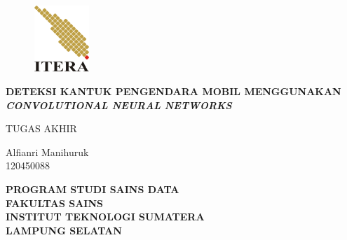 \clearpage
\pagestyle{empty}

\begin{center}
\smallskip

    \begin{figure}[h]
    	\centering
    	\includegraphics[width=2.1cm, height=2.5cm, keepaspectratio]{figures/itera-logo}
    \end{figure}

	\large \bfseries \MakeUppercase{DETEKSI KANTUK PENGENDARA MOBIL
MENGGUNAKAN \textit{CONVOLUTIONAL NEURAL NETWORKS}}
	\vfill

    \large \uppercase{Tugas Akhir}
    \vfill

    Alfianri Manihuruk\\
    120450088
    \vfill

    \normalsize \bfseries
    \uppercase{
        Program Studi Sains Data \\
        Fakultas Sains\\
        Institut Teknologi Sumatera\\
        Lampung Selatan
    }\medskip

    \the\year{}

\end{center}

\clearpage
